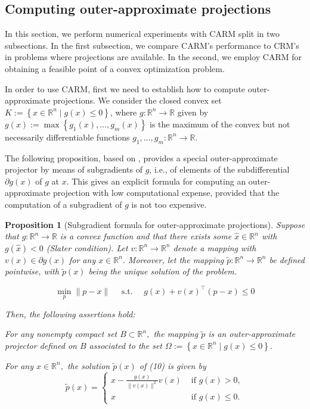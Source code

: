 \documentclass[smallextended,numbook,nospthms]{svjour3}
\theoremstyle{plain}
\newtheorem{proposition}[theorem]{Proposition}
\theoremstyle{definition}
\def\RR{\mathds R}
\begin{document}
\subsection{Computing outer-approximate projections}

In this section, we perform numerical experiments with CARM split in two subsections. In the first subsection, we compare CARM's performance to CRM's in problems where projections are available. In the second, we employ CARM for obtaining a feasible point of a convex optimization problem. 

In order to use CARM, first we need to establish how to compute outer-approximate projections. We consider the closed convex set $K:=\left\{x \in \RR^{n} \mid g(x) \leq 0\right\}$, where $g: \RR^{n} \rightarrow \RR$ given by $g(x):=\max \left\{g_{1}(x), \ldots, g_{m}(x)\right\}$ is the maximum of the convex but not necessarily differentiable functions $g_{1}, \ldots, g_{m}: \RR^{n} \rightarrow \RR$.

The following proposition, based on \cite{Fukushima:1983},  provides a special outer-approximate projector by means of subgradients of $g$, i.e., of elements of the subdifferential $\partial g(x)$ of $g$ at $x$. This gives an explicit formula for computing an outer-approximate projection with low computational expense, provided that the computation of a subgradient of $g$ is not too expensive.

\begin{proposition}[Subgradient formula for outer-approximate projections]\label{prop:approx proj formula}
	Suppose that $g: \RR^{n} \rightarrow \RR$ is a convex function and that there exists some $\hat{x} \in \RR^{n}$ with $g(\hat{x})<0$ (Slater condition). Let $v: \RR^{n} \rightarrow \RR^{n}$ denote a mapping with $v(x) \in \partial g(x)$ for any $x \in \RR^{n} .$ Moreover, let the mapping $\tilde{p}: \RR^{n} \rightarrow \RR^{n}$ be defined
	pointwise, with $\tilde{p}(x)$ being the unique solution of the problem.
	
	\begin{equation}
		\min _{p}\|p-x\| \quad \text { s.t. } \quad g(x)+v(x)^{\top}(p-x) \leq 0
	\end{equation}
	
	Then, the following assertions hold:
	\begin{listi}
		\item  For any nonempty compact set $B \subset \RR^{n},$ the mapping $\tilde{p}$ is an outer-approximate projector defined on $B$ associated to the set $\Omega:=\left\{x \in \RR^{n} \mid g(x) \leq 0\right\}$.
		
		\item  For any $x \in \RR^{n},$ the solution $\tilde{p}(x)$ of (10) is given by
		\[
		\tilde{p}(x)=\left\{\begin{array}{ll}
			x-\frac{g(x)}{\|v(x)\|^{2}} v(x) & \text { if } g(x)>0, \\
			x & \text { if } g(x) \leq 0.
		\end{array}\right.
		\]
	\end{listi}
\end{proposition}
\end{document}
